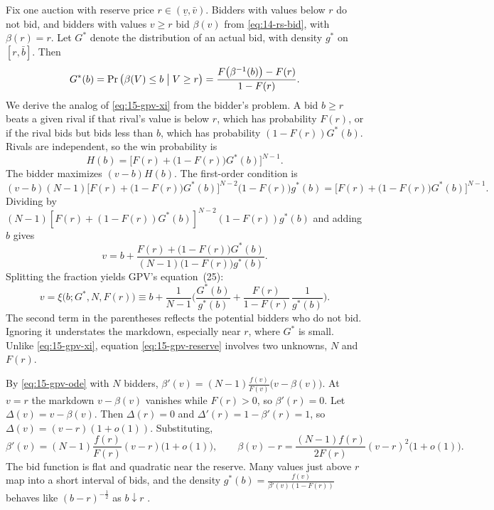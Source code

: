  Fix one auction with reserve price $r\in(\underline v,\bar v)$. Bidders with values below $r$ do not bid, and bidders with values $v\ge r$ bid $\beta(v)$ from \eqref{eq:14-rs-bid}, with $\beta(r)=r$. Let $G^*$ denote the distribution of an actual bid, with density $g^*$ on $[r,\bar b]$. Then
\[
G^*(b)=\Pr\big(\beta(V)\le b\bigm| V\ge r\big)=\frac{F\big(\beta^{-1}(b)\big)-F(r)}{1-F(r)}.
\]
We derive the analog of \eqref{eq:15-gpv-xi} from the bidder's problem. A bid $b\ge r$ beats a given rival if that rival's value is below $r$, which has probability $F(r)$, or if the rival bids but bids less than $b$, which has probability $(1-F(r))G^*(b)$. Rivals are independent, so the win probability is
\[
H(b)=\Big[F(r)+\big(1-F(r)\big)G^*(b)\Big]^{N-1}.
\]
The bidder maximizes $(v-b)H(b)$. The first-order condition is
\[
(v-b)(N-1)\Big[F(r)+\big(1-F(r)\big)G^*(b)\Big]^{N-2}\big(1-F(r)\big)g^*(b)=\Big[F(r)+\big(1-F(r)\big)G^*(b)\Big]^{N-1}.
\]
Dividing by $(N-1)[F(r)+(1-F(r))G^*(b)]^{N-2}(1-F(r))g^*(b)$ and adding $b$ gives
\[
v=b+\frac{F(r)+\big(1-F(r)\big)G^*(b)}{(N-1)\big(1-F(r)\big)g^*(b)}.
\]
Splitting the fraction yields GPV's equation~(25):
\begin{equation}\label{eq:15-gpv-reserve}
v=\xi\big(b;G^*,N,F(r)\big)\equiv b+\frac{1}{N-1}\Big(\frac{G^*(b)}{g^*(b)}+\frac{F(r)}{1-F(r)}\,\frac{1}{g^*(b)}\Big).
\end{equation}
The second term in the parentheses reflects the potential bidders who do not bid. Ignoring it understates the markdown, especially near $r$, where $G^*$ is small. Unlike \eqref{eq:15-gpv-xi}, equation \eqref{eq:15-gpv-reserve} involves two unknowns, $N$ and $F(r)$.

 By \eqref{eq:15-gpv-ode} with $N$ bidders, $\beta'(v)=(N-1)\frac{f(v)}{F(v)}\big(v-\beta(v)\big)$. At $v=r$ the markdown $v-\beta(v)$ vanishes while $F(r)>0$, so $\beta'(r)=0$. Let $\Delta(v)=v-\beta(v)$. Then $\Delta(r)=0$ and $\Delta'(r)=1-\beta'(r)=1$, so $\Delta(v)=(v-r)(1+o(1))$. Substituting,
\[
\beta'(v)=(N-1)\frac{f(r)}{F(r)}(v-r)\big(1+o(1)\big),\qquad\beta(v)-r=\frac{(N-1)f(r)}{2F(r)}(v-r)^2\big(1+o(1)\big).
\]
The bid function is flat and quadratic near the reserve. Many values just above $r$ map into a short interval of bids, and the density $g^*(b)=\frac{f(v)}{\beta'(v)(1-F(r))}$ behaves like $(b-r)^{-\frac12}$ as $b\downarrow r$ \citep[p.~549]{GuerrePerrigneVuong2000}.

